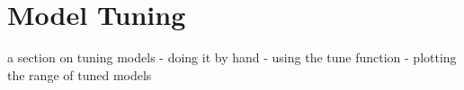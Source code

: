 
\section{Model Tuning} 
\label{advanced:tuning}

a section on tuning models
- doing it by hand
- using the tune function
- plotting the range of tuned models




